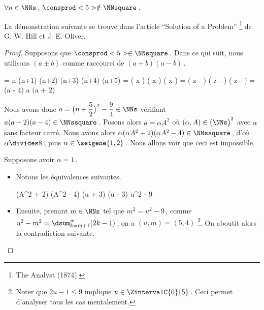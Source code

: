 \begin{fact} \label{case-6}
	 $\forall n \in \NNs$\,, $\consprod<5> \notin \NNsquare$\,.
\end{fact}




La démonstration suivante se trouve dans l'article \enquote{Solution of a Problem}
\footnote{
	The Analyst (1874).
}
de G. W. Hill et J. E. Oliver.


\begin{proof}
    Supposons que $\consprod<5> \in \NNsquare$\,. Dans ce qui suit, nous utilisons $(a \pm b)$ comme raccourci de $(a + b) (a - b)$\,.

    \medskip
    \begin{stepcalc}[style = ar*, ope = \iff]
    	 = 
			n (n+1) (n+2) (n+3) (n+4) (n+5)
    	\consprod<5> = 
			\big( x \pm {} \big) \big( x \pm {} \big) \big( x \pm {} \big) 
    	\consprod<5> = 
			\big( z -  \big) \big( z -  \big) \big( z -  \big) 
    	\consprod<5> = 
			(a - 4) a (a + 2) 
    \end{stepcalc}
    
    \medskip
    Nous avons donc $a = \big( n + \dfrac52 \big)^2 - \dfrac94 \in \NNs$ vérifiant $a (a + 2) (a - 4) \in \NNssquare$\,. 
    Posons alors $a = \alpha A^2$ où $(\alpha, A) \in \big( \NNs \big)^2$ avec $\alpha$ sans facteur carré.
    Nous avons alors $\alpha (\alpha A^2 + 2) (\alpha A^2 - 4) \in \NNssquare$\,, d'où $\alpha \divides 8$\,, puis $\alpha \in \setgene{1, 2}$\,.
    Nous allons voir que ceci est impossible.
    
    \medskip
    
    Supposons avoir $\alpha = 1$\,.
    
    \begin{itemize}
    	\item Notons les équivalences suivantes.
        
        \medskip
        \noindent\kern-6pt%
        \begin{stepcalc}[style=ar*, ope=\iff]
        	(A^2 + 2) (A^2 - 4) \in \NNssquare
        	(u + 3) (u - 3) \in \NNssquare
    	\explnext{}
        	u^2 - 9 \in \NNssquare
        \end{stepcalc}

		\item Ensuite, prenant $m \in \NNs$ tel que $m^2 = u^2 - 9$\,, comme $u^2 - m^2 = \dsum_{k=m+1}^{w} (2 k - 1)$\,, on a $(u, m) = (5, 4)$
		\footnote{
			Noter que $2 u - 1 \leq 9$ implique $u \in \ZintervalC{0}{5}$\,. Ceci permet d'analyser tous les cas mentalement.
		}.
		On aboutit alors la contradiction suivante.
        

\end{itemize}
\end{proof}
